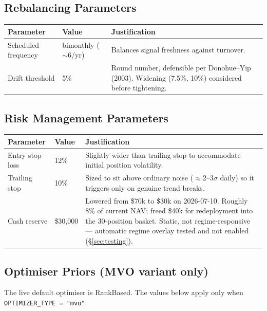 \documentclass[11pt,a4paper]{article}
\begin{document}
\subsection{Rebalancing Parameters}

\begin{table}[H]
\centering
\renewcommand{\arraystretch}{1.4}
\begin{tabular}{p{3.5cm}p{3cm}p{7.5cm}}
\toprule
\textbf{Parameter} & \textbf{Value} & \textbf{Justification} \\
\midrule
Scheduled frequency & bimonthly ($\sim$6/yr) & Balances signal freshness against turnover. \\
Drift threshold & 5\% & Round number, defensible per Donohue--Yip (2003). Widening (7.5\%, 10\%) considered before tightening. \\
\bottomrule
\end{tabular}
\end{table}

\subsection{Risk Management Parameters}

\begin{table}[H]
\centering
\renewcommand{\arraystretch}{1.4}
\begin{tabular}{p{4cm}p{2cm}p{8cm}}
\toprule
\textbf{Parameter} & \textbf{Value} & \textbf{Justification} \\
\midrule
Entry stop-loss & 12\% & Slightly wider than trailing stop to accommodate initial position volatility. \\
Trailing stop & 10\% & Sized to sit above ordinary noise ($\approx$2--3$\sigma$ daily) so it triggers only on genuine trend breaks. \\
Cash reserve & \$30{,}000 & Lowered from \$70k to \$30k on 2026-07-10. Roughly 8\% of current NAV; freed \$40k for redeployment into the 30-position basket. Static, not regime-responsive --- automatic regime overlay tested and not enabled (\S\ref{sec:testing}). \\
\bottomrule
\end{tabular}
\end{table}

\subsection{Optimiser Priors (MVO variant only)}

The live default optimiser is RankBased. The values below apply only when \texttt{OPTIMIZER\_TYPE = "mvo"}.
\end{document}
